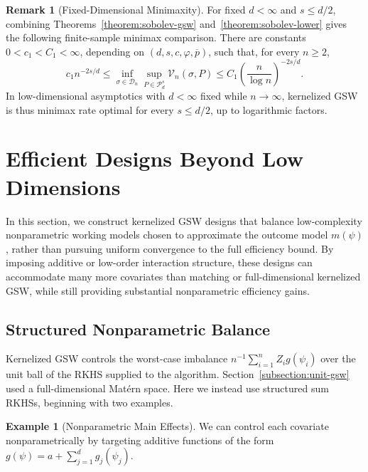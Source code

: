 \documentclass[letterpaper,12pt]{article}
\theoremstyle{definition}
\newtheorem{ex}[thm]{Example}
\newtheorem{remark}[thm]{Remark}
\numberwithin{equation}{section}
\newcommand{\mc}{\mathcal}
\begin{document}
\begin{remark}[Fixed-Dimensional Minimaxity]
For fixed $d < \infty$ and $s\leq d/2$, combining Theorems~\ref{theorem:sobolev-gsw} and~\ref{theorem:sobolev-lower} gives the following finite-sample minimax comparison.
There are constants $0<c_1<C_1<\infty$, depending on $(d,s,c,\varphi,\overline p)$, such that, for every $n\geq2$,
\begin{equation}\label{equation:sobolev-minimax}
c_1 n^{-2s/d} \leq \inf_{\sigma\in\mc D_n} \sup_{P\in\mc P_d^s}\mc V_n(\sigma,P) \leq C_1\left(\frac n{\log n}\right)^{-2s/d}.
\end{equation}
In low-dimensional asymptotics with $d<\infty$ fixed while $n\to\infty$, kernelized GSW is thus minimax rate optimal for every $s\leq d/2$, up to logarithmic factors.
\end{remark}

\section{Efficient Designs Beyond Low Dimensions}\label{section:restricted-efficiency}
In this section, we construct kernelized GSW designs that balance low-complexity nonparametric working models chosen to approximate the outcome model $m(\psi)$, rather than pursuing uniform convergence to the full efficiency bound.
By imposing additive or low-order interaction structure, these designs can accommodate many more covariates than matching or full-dimensional kernelized GSW, while still providing substantial nonparametric efficiency gains.

\subsection{Structured Nonparametric Balance}\label{subsection:structured-balance}

Kernelized GSW controls the worst-case imbalance $n^{-1}\sum_{i=1}^nZ_ig(\psi_i)$ over the unit ball of the RKHS supplied to the algorithm.
Section~\ref{subsection:unit-gsw} used a full-dimensional Mat\'ern space.
Here we instead use structured sum RKHSs, beginning with two examples.

\begin{ex}[Nonparametric Main Effects]\label{example:structured-priority}
We can control each covariate nonparametrically by targeting additive functions of the form $g(\psi)=a+\sum_{j=1}^dg_j(\psi_j)$.
\end{ex}
\end{document}
